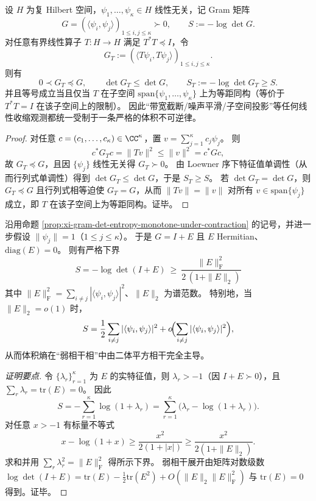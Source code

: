 %

\begin{proposition}\label{prop:xi-gram-det-entropy-monotone-under-contraction}
设 \(H\) 为复 Hilbert 空间，\(\psi_1,\dots,\psi_\kappa\in H\) 线性无关，记 Gram 矩阵
\[
G=(\langle\psi_i,\psi_j\rangle)_{1\le i,j\le\kappa}\succ0,
\qquad
S:=-\log\det G.
\]
对任意有界线性算子 \(T:H\to H\) 满足 \(T^\ast T\preceq I\)，令
\[
G_T:=(\langle T\psi_i,T\psi_j\rangle)_{1\le i,j\le\kappa}.
\]
则有
\[
\boxed{\;
0\prec G_T\preceq G,\qquad
\det G_T\le \det G,\qquad
S_T:=-\log\det G_T\ge S.\;}
\]
并且等号成立当且仅当 \(T\) 在子空间 \(\mathrm{span}\{\psi_1,\dots,\psi_\kappa\}\) 上为等距同构（等价于 \(T^\ast T=I\) 在该子空间上的限制）。
因此“带宽截断/噪声平滑/子空间投影”等任何线性收缩观测都统一受制于一条严格的体积不可逆律。
\end{proposition}
\begin{proof}
对任意 \(c=(c_1,\dots,c_\kappa)\in\CC^\kappa\)，置 \(v=\sum_{j=1}^\kappa c_j\psi_j\)。
则
\[
c^\ast G_T c=\|Tv\|^2\le \|v\|^2=c^\ast G c,
\]
故 \(G_T\preceq G\)，且因 \(\{\psi_j\}\) 线性无关得 \(G_T\succ0\)。
由 Loewner 序下特征值单调性（从而行列式单调性）得到 \(\det G_T\le \det G\)，于是 \(S_T\ge S\)。
若 \(\det G_T=\det G\)，则 \(G_T\preceq G\) 且行列式相等迫使 \(G_T=G\)，从而 \(\|Tv\|=\|v\|\) 对所有 \(v\in\mathrm{span}\{\psi_j\}\) 成立，即 \(T\) 在该子空间上为等距同构。证毕。
\end{proof}

\begin{proposition}\label{prop:xi-gram-entropy-lower-bound-by-coherence}
沿用命题 \ref{prop:xi-gram-det-entropy-monotone-under-contraction} 的记号，并进一步假设 \(\|\psi_j\|=1\)（\(1\le j\le\kappa\)）。
于是 \(G=I+E\) 且 \(E\) Hermitian、\(\mathrm{diag}(E)=0\)。
则有严格下界
\[
\boxed{\;
S=-\log\det(I+E)\ \ge\ \frac{\|E\|_{\mathrm F}^{2}}{2\,(1+\|E\|_{2})}\;}
\]
其中 \(\|E\|_{\mathrm F}^{2}=\sum_{i\neq j}|\langle\psi_i,\psi_j\rangle|^2\)、\(\|E\|_2\) 为谱范数。
特别地，当 \(\|E\|_2=o(1)\) 时，
\[
S=\frac12\sum_{i\neq j}|\langle\psi_i,\psi_j\rangle|^2+o\!\Bigl(\sum_{i\neq j}|\langle\psi_i,\psi_j\rangle|^2\Bigr),
\]
从而体积熵在“弱相干相”中由二体平方相干完全主导。
\end{proposition}
\begin{proof}[证明要点]
令 \(\{\lambda_r\}_{r=1}^\kappa\) 为 \(E\) 的实特征值，则 \(\lambda_r>-1\)（因 \(I+E\succ0\)），且 \(\sum_r\lambda_r=\mathrm{tr}(E)=0\)。
因此
\[
S=-\sum_{r=1}^\kappa\log(1+\lambda_r)=\sum_{r=1}^\kappa\bigl(\lambda_r-\log(1+\lambda_r)\bigr).
\]
对任意 \(x>-1\) 有标量不等式
\[
x-\log(1+x)\ge \frac{x^2}{2(1+|x|)}\ge \frac{x^2}{2(1+\|E\|_2)}.
\]
求和并用 \(\sum_r\lambda_r^2=\|E\|_{\mathrm F}^2\) 得所示下界。
弱相干展开由矩阵对数级数
\(
\log\det(I+E)=\mathrm{tr}(E)-\frac12\mathrm{tr}(E^2)+O(\|E\|_2\|E\|_{\mathrm F}^2)
\)
与 \(\mathrm{tr}(E)=0\) 得到。证毕。
\end{proof}

